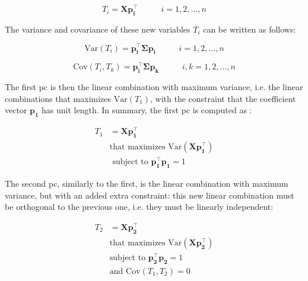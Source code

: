 \begin{equation}
	\label{eqn:pca-lincomb}
	T_i=\mathbf{Xp_i^\intercal} \;\;\;\;\;\;\;\;\;\; i = 1, 2, ..., n
\end{equation}

The variance and covariance of these new variables $T_i$ can be written as follows:

\begin{equation}
	\label{eqn:pca-var}
	\text{Var}(T_i) = \mathbf{p_i^\intercal \Sigma p_i} \;\;\;\;\;\;\;\;\;\; i = 1, 2, ..., n
\end{equation}

\begin{equation}
	\label{eqn:pca-cov}
	\text{Cov}(T_i, T_k) = \mathbf{p_i^\intercal \Sigma p_k}\;\;\;\;\;\;\;\;\;\; i,k= 1, 2, ..., n
\end{equation}

The first \acrfull{pc} is then the linear combination with maximum variance, i.e. the linear combinations that maximizes $\text{Var}(T_1)$, with the constraint that the coefficient vector $\mathbf{p_1}$ has unit length. In summary, the first \acrshort{pc} is computed as \parencite{johnson2013applied}:

\begin{equation}
	\label{eqn:pca-pc1}
	\begin{split}
		T_1 & =\mathbf{Xp_1^\intercal} \\
			   & \text{that maximizes Var}(\mathbf{Xp_1^\intercal}) \\
			   & \text{ subject to }  \mathbf{p_1^\intercal p_1} = 1
	\end{split}
\end{equation}

The second \acrshort{pc}, similarly to the first, is the linear combination with maximum variance, but with an added extra constraint: this new linear combination must be orthogonal to the previous one, i.e. they must be linearly independent:

\begin{equation}
	\label{eqn:pca-pc2}
	\begin{split}
		T_2 & =\mathbf{Xp_2^\intercal} \\
		& \text{that maximizes Var}(\mathbf{Xp_2^\intercal}) \\
		& \text{subject to }  \mathbf{p_2^\intercal p_2} = 1 \\
		& \text{and } \text{Cov}(T_1, T_2) = 0
	\end{split}
\end{equation}

